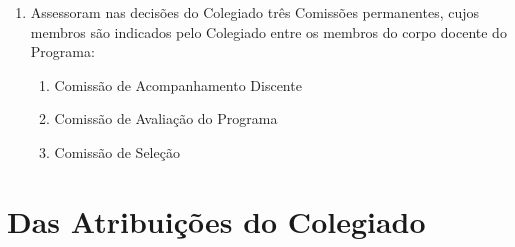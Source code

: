 \documentclass{article}
\begin{document}
\begin{enumerate}
	\item Assessoram nas decisões do Colegiado três Comissões permanentes, cujos membros são indicados pelo Colegiado entre os membros do corpo docente do Programa:
	\begin{enumerate}[label=\Roman*]
		\item Comissão de Acompanhamento Discente
		\item Comissão de Avaliação do Programa
		\item Comissão de Seleção
	\end{enumerate}

\end{enumerate}

\section{Das Atribuições do Colegiado}
\end{document}
